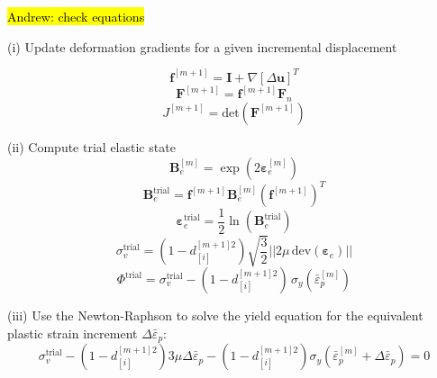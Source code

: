 \documentclass[sn-mathphys,Numbered,draft]{sn-jnl}%
\newcommand{\bb}{\boldsymbol}
\begin{document}
\hl{Andrew: check equations}\\
\begin{algorithm}[htbp] \label{alg:phaseField} \footnotesize
\SetAlgoLined
(i) Update deformation gradients for a given incremental displacement

\begin{equation}
  \textbf{f}^{[m+1]}=\textbf{I}+\nabla\left[\Delta\textbf{u}\right]^T \nonumber
\end{equation}
\begin{equation}
 \textbf{F}^{[m+1]}=\textbf{f}^{[m+1]}\textbf{F}_n\nonumber
\end{equation}
\begin{equation}
 J^{[m+1]}=\text{det} \left(\textbf{F}^{[m+1]} \right)\nonumber
\end{equation}

(ii) Compute trial elastic state
\begin{equation}
	\mathbf{B}_{e}^{[m]} = \exp\left({2\boldsymbol{\varepsilon}_{e}^{[m]}}\right) \nonumber
\end{equation}
\begin{equation}
	\mathbf{B}^{\text{trial}}_e = \mathbf{f}^{[m+1]}\mathbf{B}^{[m]}_e \left(\mathbf{f}^{[m+1]}\right)^{T}\nonumber
\end{equation}
\begin{equation}
	\boldsymbol{\varepsilon}^{\text{trial}}_e = \frac{1}{2} \ln \left(\textbf{B}^{\text{trial}}_e \right) \nonumber
\end{equation}
\begin{equation}
	\sigma_v^{\text{trial}} =
	\left(1 - d_{[i]}^{[m+1]2} \right) \sqrt{\frac{3}{2}} || 2\mu \, \text{dev}(\bb{\varepsilon}_e)|| \nonumber
\end{equation}
\begin{equation}
	\Phi^{\text{trial}} =
	\sigma_v^{\text{trial}}
	- \left(1 - d_{[i]}^{[m+1]2} \right) \, \sigma_{y}\left(\bar{\varepsilon}_p^{[m]} \right) \nonumber 
\end{equation}

(iii) Use the Newton-Raphson to solve the yield equation for the equivalent plastic strain increment $\Delta\bar{\varepsilon}_p$:
\begin{equation}
	\sigma_v^{\text{trial}}
	- \left(1 - d_{[i]}^{[m+1]2} \right) 3 \mu\Delta\bar{\varepsilon}_p
	- \left(1 - d_{[i]}^{[m+1]2} \right) \sigma_{y}(\bar{\varepsilon}_{p}^{[m]} + \Delta\bar{\varepsilon}_p)
	= 0 \nonumber
\end{equation}



\end{algorithm}
\end{document}
